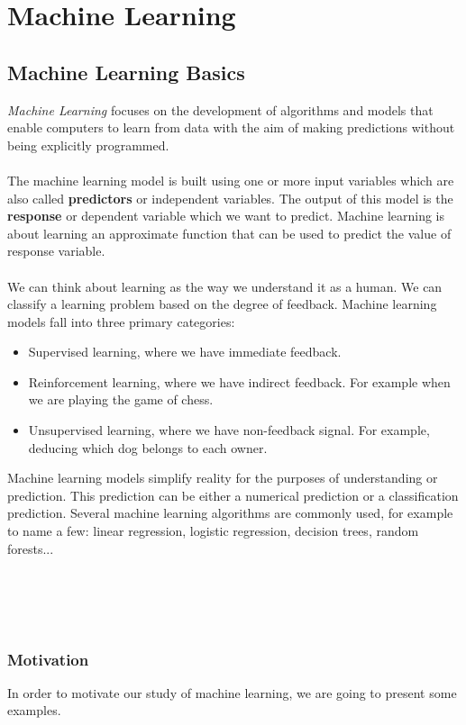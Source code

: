 \documentclass[../main.tex]{subfiles}
\begin{document}
	\chapter{Machine Learning} \label{ch:machine}
	

	\section{Machine Learning Basics}
	\noindent 
	
	\noindent  \textit{Machine Learning} focuses on the development of algorithms and models that enable computers to learn from data with the aim of making predictions without being explicitly programmed. \\ \\ 
	The machine learning model is built using one or more input variables which are also called \textbf{predictors} or independent variables. The output of this model is the \textbf{response} or dependent variable which we want to predict. Machine learning is about learning an approximate function that can be used to predict the value of response variable.\\ \\
	We can think about learning as the way we understand it as a human. We can classify a learning problem based on the degree of feedback. Machine learning models fall into three primary categories:
	\begin{itemize}
		\item Supervised learning, where we have immediate feedback.
		\item Reinforcement learning, where we have indirect feedback. For example when we are playing the game of chess.
		\item Unsupervised learning, where we have non-feedback signal. For example, deducing which dog belongs to each owner.
	\end{itemize}
	Machine learning models simplify reality for the purposes of understanding or prediction. This prediction can be either a numerical prediction or a classification prediction. Several machine learning algorithms are commonly used, for example to name a few: linear regression, logistic regression, decision trees, random forests...
	\\ \\ \\ \\ \\ 
	
	\subsection{Motivation }
	\noindent In order to motivate our study of machine learning, we are going to present some examples.  
	
\end{document}
